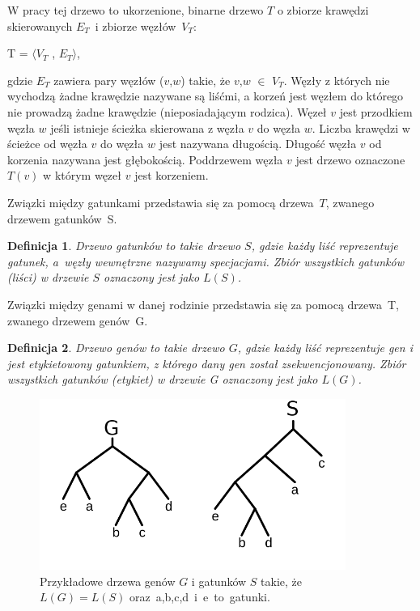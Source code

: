 \documentclass[licencjacka]{pracamgr}
\newtheorem{defi}{Definicja}[section]
\begin{document}
W pracy tej drzewo to ukorzenione, binarne drzewo $T$ o zbiorze krawędzi skierowanych $E_T$~i zbiorze węzłów~$V_T$:
\begin{center}
T = $\langle V_T$ , $E_T  \rangle$,
\end{center}
gdzie $E_T$ zawiera pary węzłów ($v$,$w$) takie, że $v$,$w$ $\in$ $V_T$. Węzły z których nie wychodzą żadne krawędzie nazywane są liśćmi, a korzeń jest węzłem do którego nie prowadzą żadne krawędzie (nieposiadającym rodzica). Węzeł $v$ jest przodkiem węzła $w$ jeśli istnieje ścieżka skierowana z węzła $v$ do węzła $w$. Liczba krawędzi w ścieżce od węzła $v$ do węzła $w$ jest nazywana długością. Długość węzła $v$ od korzenia nazywana jest głębokością. Poddrzewem węzła $v$ jest drzewo oznaczone $T(v)$ w którym węzeł $v$ jest korzeniem. 

Związki między gatunkami przedstawia się za pomocą drzewa~$T$, zwanego drzewem gatunków~S.
\begin{defi}\label{Drzewa gatunków}
  Drzewo gatunków to takie drzewo $S$, gdzie każdy liść reprezentuje gatunek, a~węzły wewnętrzne nazywamy specjacjami. Zbiór wszystkich gatunków (liści) w drzewie $S$ oznaczony jest jako $L(S)$. 
\end{defi}

Związki między genami w danej rodzinie przedstawia się za pomocą drzewa~T, zwanego drzewem genów~G.
\begin{defi}\label{Drzewa genów}
  Drzewo genów to takie drzewo $G$, gdzie każdy liść reprezentuje gen i jest etykietowony gatunkiem, z którego dany gen został zsekwencjonowany. Zbiór wszystkich gatunków (etykiet) w drzewie G oznaczony jest jako $L(G)$.
\end{defi}


\begin{figure}[H]
	\centering
	\includegraphics[width=100mm]{./pictures/spec_gen.png}
	\caption{Przykładowe drzewa genów $G$ i gatunków $S$ takie, że $L(G)=L(S)$ oraz~a,b,c,d~i~e~to~gatunki.}
\end{figure}
\end{document}

